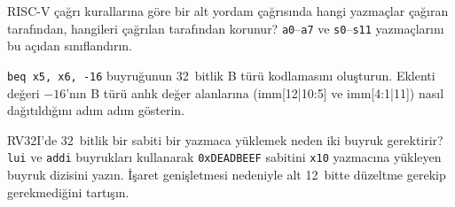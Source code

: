 \begin{alistirma}[\orta]
RISC-V çağrı kurallarına göre bir alt yordam çağrısında hangi yazmaçlar çağıran tarafından, hangileri çağrılan tarafından korunur? \texttt{a0}--\texttt{a7} ve \texttt{s0}--\texttt{s11} yazmaçlarını bu açıdan sınıflandırın.
\end{alistirma}

\begin{alistirma}[\zor]
\texttt{beq x5, x6, -16} buyruğunun 32~bitlik B türü kodlamasını oluşturun. Eklenti değeri $-16$'nın B türü anlık değer alanlarına (imm[12|10:5] ve imm[4:1|11]) nasıl dağıtıldığını adım adım gösterin.
\end{alistirma}

\begin{alistirma}[\zor]
RV32I'de 32~bitlik bir sabiti bir yazmaca yüklemek neden iki buyruk gerektirir? \texttt{lui} ve \texttt{addi} buyrukları kullanarak \texttt{0xDEADBEEF} sabitini \texttt{x10} yazmacına yükleyen buyruk dizisini yazın. İşaret genişletmesi nedeniyle alt 12~bitte düzeltme gerekip gerekmediğini tartışın.
\end{alistirma}
